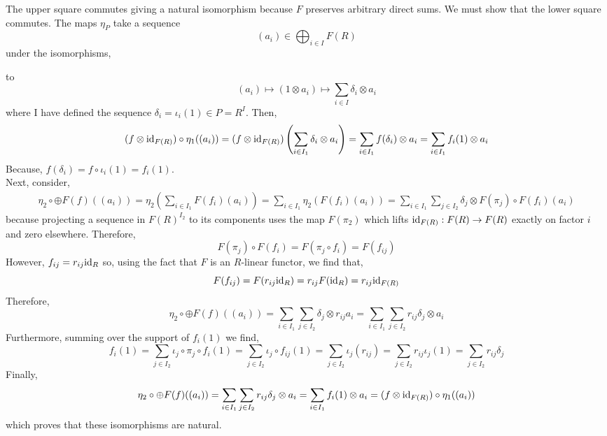 \documentclass[12pt]{article}
\begin{document}
The upper square commutes giving a natural isomorphism because $F$ preserves arbitrary direct sums. We must show that the lower square commutes. The maps $\eta_P$ take a sequence 
\[ (a_i) \in \bigoplus_{i \in I} F(R) \]
 under the isomorphisms,
\begin{center}
\end{center}
to
\[ (a_i) \mapsto (1 \otimes a_i) \mapsto \sum_{i \in I} \delta_i \otimes a_i \]
where I have defined the sequence $\delta_i = \iota_i(1) \in P = R^I$. Then,
\begin{align*}
(f \otimes \mathrm{id}_{F(R)}) \circ \eta_1((a_i)) = (f \otimes \mathrm{id}_{F(R)})\left( \sum_{i \in I_1} \delta_i \otimes a_i \right) = \sum_{i \in I_1} f(\delta_i) \otimes a_i = \sum_{i \in I_1} f_i(1) \otimes a_i
\end{align*}
Because, $f(\delta_i) = f \circ \iota_i(1) = f_i(1)$.
\bigskip\\
Next, consider,
\begin{align*}
\eta_2 \circ \oplus F(f)((a_i)) = \eta_2 \left( \sum_{i \in I_1} F(f_i)(a_i) \right) = \sum_{i \in I_1} \eta_2(F(f_i)(a_i)) = \sum_{i \in I_1} \sum_{j \in I_2} \delta_j \otimes F(\pi_j) \circ F(f_i)(a_i)
\end{align*} 
because projecting a sequence in $F(R)^{I_2}$ to its components uses the map $F(\pi_2)$ which lifts $\mathrm{id}_{F(R)} : F(R) \to F(R)$ exactly on factor $i$ and zero elsewhere.
Therefore,
\[ F(\pi_j) \circ F(f_i) = F(\pi_j \circ f_i) = F(f_{ij}) \]
However, $f_{ij} = r_{ij} \mathrm{id}_{R}$ so, using the fact that $F$ is an $R$-linear functor, we find that,
\[ F(f_{ij}) = F(r_{ij} \mathrm{id}_{R}) = r_{ij} F(\mathrm{id}_R) = r_{ij} \mathrm{id}_{F(R)} \]
Therefore, 
\[ \eta_2 \circ \oplus F(f)((a_i)) = \sum_{i \in I_1} \sum_{j \in I_2} \delta_j \otimes r_{ij} a_i = \sum_{i \in I_1} \sum_{j \in I_2} r_{ij} \delta_j \otimes a_i \]
Furthermore, summing over the support of $f_i(1)$ we find,
\[ f_i(1) = \sum_{j \in I_2} \iota_j \circ \pi_j \circ f_i(1) = \sum_{j \in I_2} \iota_j \circ f_{ij}(1) = \sum_{j \in I_2} \iota_j(r_{ij}) = \sum_{j \in I_2} r_{ij} \iota_j(1)  = \sum_{j \in I_2} r_{ij} \delta_j  \]
Finally,
\[ \eta_2 \circ \oplus F(f)((a_i)) = \sum_{i \in I_1} \sum_{j \in I_2} r_{ij} \delta_j \otimes a_i = \sum_{i \in I_1} f_i(1) \otimes a_i = (f \otimes \mathrm{id}_{F(R)}) \circ \eta_1((a_i)) \]
which proves that these isomorphisms are natural. 
\end{document}
